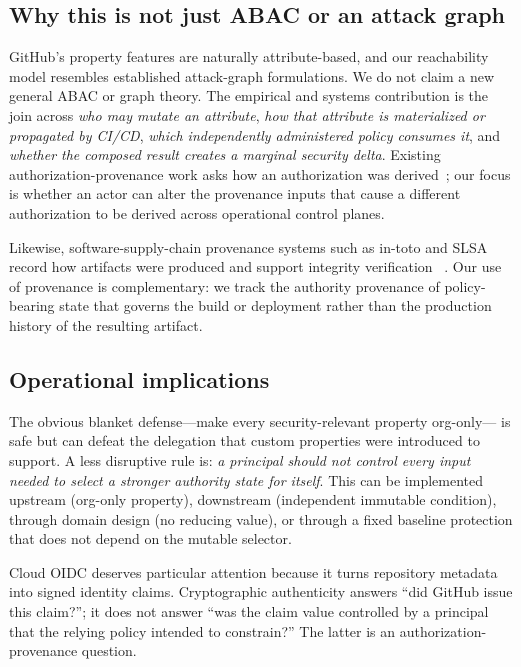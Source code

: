 \documentclass[sigconf,review,anonymous]{acmart}
\begin{document}
\subsection{Why this is not just ABAC or an attack graph}

GitHub's property features are naturally attribute-based, and our reachability
model resembles established attack-graph formulations.  We do not claim a new
general ABAC or graph theory.  The empirical and systems contribution is the
join across \emph{who may mutate an attribute}, \emph{how that attribute is
materialized or propagated by CI/CD}, \emph{which independently administered
policy consumes it}, and \emph{whether the composed result creates a marginal
security delta}.  Existing authorization-provenance work asks how an
authorization was derived~\cite{hu2010authprov}; our focus is whether an actor
can alter the provenance inputs that cause a different authorization to be
derived across operational control planes.

Likewise, software-supply-chain provenance systems such as in-toto and SLSA
record how artifacts were produced and support integrity verification
~\cite{torresarias2019intoto,slsa12}.  Our use of provenance is complementary:
we track the authority provenance of policy-bearing state that governs the build
or deployment rather than the production history of the resulting artifact.

\subsection{Operational implications}

The obvious blanket defense---make every security-relevant property org-only---
is safe but can defeat the delegation that custom properties were introduced to
support.  A less disruptive rule is: \emph{a principal should not control every
input needed to select a stronger authority state for itself}.  This can be
implemented upstream (org-only property), downstream (independent immutable
condition), through domain design (no reducing value), or through a fixed
baseline protection that does not depend on the mutable selector.

Cloud OIDC deserves particular attention because it turns repository metadata
into signed identity claims.  Cryptographic authenticity answers ``did GitHub
issue this claim?''; it does not answer ``was the claim value controlled by a
principal that the relying policy intended to constrain?''  The latter is an
authorization-provenance question.
\end{document}
